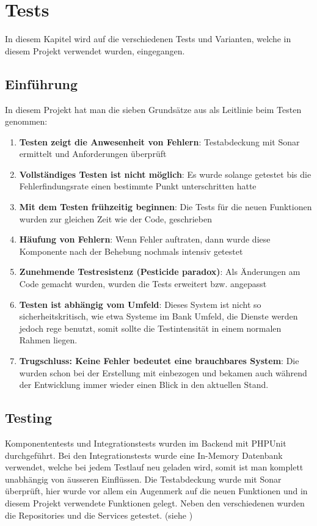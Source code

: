 %
%

\chapter{Tests}\label{chap.tests} 
In diesem Kapitel wird auf die verschiedenen Tests und Varianten, welche in diesem Projekt verwendet wurden, eingegangen.

\section{Einführung}
In diesem Projekt hat man die sieben Grundsätze aus \cite{test_soft_book} als Leitlinie beim Testen genommen:
\begin{enumerate}
\item \textbf{Testen zeigt die Anwesenheit von Fehlern}: Testabdeckung mit Sonar ermittelt und Anforderungen überprüft
\item \textbf{Vollständiges Testen ist nicht möglich}: Es wurde solange getestet bis die Fehlerfindungsrate einen bestimmte Punkt unterschritten hatte
\item \textbf{Mit dem Testen frühzeitig beginnen}: Die Tests für die neuen Funktionen wurden zur gleichen Zeit wie der Code, geschrieben
\item \textbf{Häufung von Fehlern}: Wenn Fehler auftraten, dann wurde diese Komponente nach der Behebung nochmals intensiv getestet
\item \textbf{Zunehmende Testresistenz (Pesticide paradox)}: Als Änderungen am Code gemacht wurden, wurden die Tests erweitert bzw. angepasst
\item \textbf{Testen ist abhängig vom Umfeld}: Dieses System ist nicht so sicherheitskritisch, wie etwa Systeme im Bank Umfeld, die Dienste werden jedoch rege benutzt, somit sollte die Testintensität in einem normalen Rahmen liegen.
\item \textbf{Trugschluss: Keine Fehler bedeutet eine brauchbares System}: Die  wurden schon bei der  Erstellung mit einbezogen und bekamen auch während der Entwicklung immer wieder einen Blick in den aktuellen Stand.
\end{enumerate}

\section{Testing}
Komponententests und Integrationstests wurden im Backend mit PHPUnit durchgeführt. Bei den Integrationstests wurde eine In-Memory Datenbank verwendet, welche bei jedem Testlauf neu geladen wird, somit ist man komplett unabhängig von äusseren Einflüssen. Die Testabdeckung wurde mit Sonar überprüft, hier wurde vor allem ein Augenmerk auf die neuen Funktionen und in diesem Projekt verwendete Funktionen gelegt. Neben den verschiedenen  wurden die Repositories und die Services getestet. (siehe \cite{test_soft_book})

